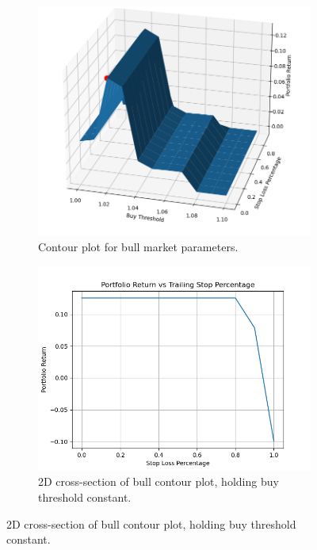 \documentclass{article}
\begin{document}
\begin{figure}[H]
    \centering
    \begin{subfigure}{0.495\textwidth}
        \centering
        \includegraphics[width=\linewidth]{bullContour.png}
        \caption{Contour plot for bull market parameters.}
        \label{fig:bullcontourPlot}
    \end{subfigure}
    \hfill
    \begin{subfigure}{0.495\textwidth}
        \centering
        \includegraphics[width=\linewidth]{bullStopSlice.png}
        \caption{2D cross-section of bull contour plot, holding buy threshold constant.}

\end{subfigure}
\end{figure}
\end{document}
